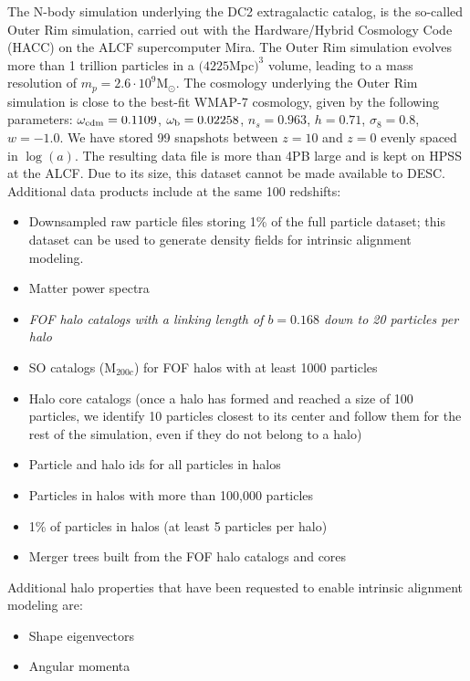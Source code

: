 \documentclass[preprint,times]{aastex61}
\begin{document}
The N-body simulation underlying the DC2 extragalactic catalog, is the so-called Outer Rim simulation, carried
out with the Hardware/Hybrid Cosmology Code (HACC) on the ALCF supercomputer Mira. The Outer Rim simulation evolves more than 1 trillion particles in a $(4225$Mpc$)^3$ volume, leading to a mass resolution of $m_p=2.6\cdot 10^9$M$_\odot$. The cosmology underlying the Outer Rim simulation is close to the best-fit WMAP-7 cosmology, given by the following parameters: $\omega_{\rm cdm}=0.1109$, $\omega_{\rm b}=0.02258$,
$n_s=0.963$, $h=0.71$, $\sigma_8=0.8$, $w=-1.0$. We have stored 99 snapshots between $z=10$ and $z=0$ evenly spaced in $\log (a)$. The resulting data file is more than 4PB large and is kept on HPSS at the ALCF. Due to its size, this dataset cannot be made available to DESC. Additional data products include at the same 100 redshifts:
\begin{itemize}
\item Downsampled raw particle files storing 1\% of the full particle dataset; this dataset can be used to generate density fields for intrinsic alignment modeling. 
\item Matter power spectra
\item {\it FOF halo catalogs with a linking length of $b=0.168$ down to 20 particles per halo}
\item SO catalogs (M$_{200c}$) for FOF halos with at least 1000 particles
\item Halo core catalogs (once a halo has formed and reached a size of 100 particles, we identify 10 particles closest to its center and follow them for the rest of the simulation, even if they do not belong to a halo)
\item Particle and halo ids for all particles in halos
\item Particles in halos with more than 100,000 particles
\item 1\% of particles in halos (at least 5 particles per halo)
\item Merger trees built from the FOF halo catalogs and cores
\end{itemize}
Additional halo properties that have been requested to enable intrinsic alignment modeling are:
\begin{itemize}
\item Shape eigenvectors
\item Angular momenta
\end{itemize}
\end{document}
